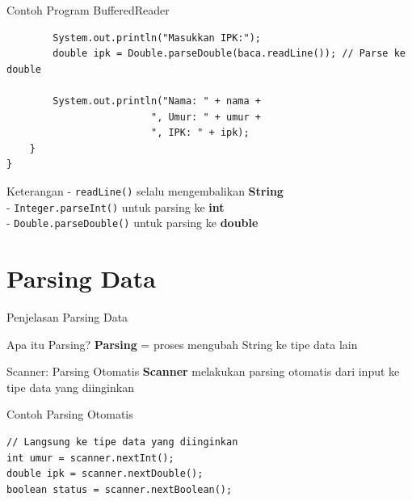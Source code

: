 \documentclass{beamer}
\begin{document}
\begin{frame}[fragile]{Contoh Program BufferedReader}
\begin{lstlisting}
        System.out.println("Masukkan IPK:");
        double ipk = Double.parseDouble(baca.readLine()); // Parse ke double
        
        System.out.println("Nama: " + nama + 
                         ", Umur: " + umur + 
                         ", IPK: " + ipk);
    }
}
\end{lstlisting}

\begin{block}{Keterangan}
- \texttt{readLine()} selalu mengembalikan \textbf{String}\\
- \texttt{Integer.parseInt()} untuk parsing ke \textbf{int}\\
- \texttt{Double.parseDouble()} untuk parsing ke \textbf{double}
\end{block}
\end{frame}

\section{Parsing Data}
\begin{frame}[fragile]{Penjelasan Parsing Data}
  \begin{block}{Apa itu Parsing?}
    \textbf{Parsing} = proses mengubah String ke tipe data lain
  \end{block}
\end{frame}

\begin{frame}[fragile]{Scanner: Parsing Otomatis}
  \textbf{Scanner} melakukan parsing otomatis dari input ke tipe data yang diinginkan
  
  \begin{exampleblock}{Contoh Parsing Otomatis}
    \begin{lstlisting}
// Langsung ke tipe data yang diinginkan
int umur = scanner.nextInt();
double ipk = scanner.nextDouble();
boolean status = scanner.nextBoolean();
    \end{lstlisting}
  \end{exampleblock}
\end{frame}
\end{document}
